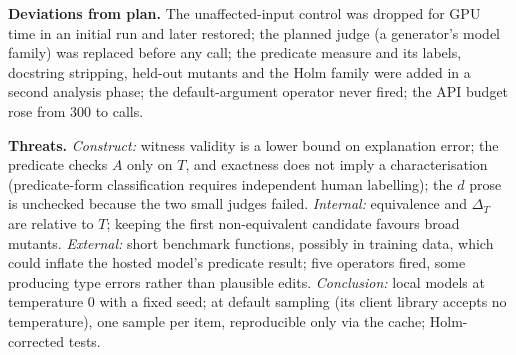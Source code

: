\textbf{Deviations from plan.} The unaffected-input control was dropped for GPU time in an initial run and later restored; the
planned judge (a generator's model family) was replaced before any call; the predicate measure and its labels,
docstring stripping, held-out mutants and the Holm family were added in a second analysis phase; the default-argument operator never fired; the API budget rose from 300 to \SLlmCallsStrong{} calls.

\textbf{Threats.} \emph{Construct:} witness validity is a lower bound on explanation error; the predicate checks $A$
only on $T$, and exactness does not imply a characterisation (predicate-form classification requires independent human
labelling); the $d$ prose is
unchecked because the two small judges failed. \emph{Internal:} equivalence and $\Delta_T$ are relative to $T$; keeping the first
non-equivalent candidate favours broad mutants. \emph{External:} short benchmark functions, possibly in training
data, which could inflate the hosted model's predicate result; five operators fired, some producing type errors rather than plausible edits. \emph{Conclusion:} local models at
temperature 0 with a fixed seed; \StrongModel{} at default sampling (its client library accepts no temperature), one sample per item,
reproducible only via the cache; Holm-corrected tests.
